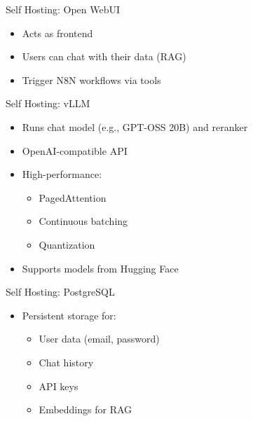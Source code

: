 \documentclass{beamer}
\begin{document}

\begin{frame}{Self Hosting: Open WebUI}
\begin{itemize}
    \item Acts as frontend
    \item Users can chat with their data (RAG)
    \item Trigger N8N workflows via tools
\end{itemize}
\end{frame}


\begin{frame}{Self Hosting: vLLM}
\begin{itemize}
    \item Runs chat model (e.g., GPT-OSS 20B) and reranker
    \item OpenAI-compatible API
    \item High-performance:
    \begin{itemize}
        \item PagedAttention
        \item Continuous batching
        \item Quantization
    \end{itemize}
    \item Supports models from Hugging Face
\end{itemize}
\end{frame}


\begin{frame}{Self Hosting: PostgreSQL}
\begin{itemize}
    \item Persistent storage for:
    \begin{itemize}
        \item User data (email, password)
        \item Chat history
        \item API keys
        \item Embeddings for RAG
    \end{itemize}
\end{itemize}
\end{frame}

\end{document}
